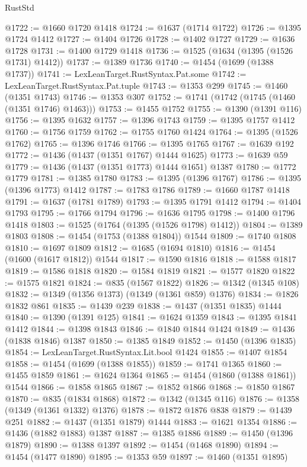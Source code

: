 \begin{lexlean}{RustStd}
\begin{coremodule}
{\begin{coremodule}
{{{{{{{{{{@1722 := @1660 @1720 @1418
@1724 := @1637 (@1714 @1722)
@1726 := @1395 @1724 @1412
@1727 := @1404 @1726
@1728 := @1402 @1727
@1729 := @1636 @1728
@1731 := @1400 @1729 @1418
@1736 := @1525 (@1634 (@1395 (@1526 @1731) @1412))
@1737 := @1389 @1736
@1740 := @1454 (@1699 (@1388 @1737))
@1741 := LexLeanTarget.RustSyntax.Pat.some
@1742 := LexLeanTarget.RustSyntax.Pat.tuple
@1743 := @1353 @299
@1745 := @1460 (@1351 @1743)
@1746 := @1353 @307
@1752 := @1741 (@1742 (@1745 (@1460 (@1351 @1746) @1463)))
@1753 := @1455 @1752
@1755 := @1390 (@1391 @116)
@1756 := @1395 @1632
@1757 := @1396 @1743
@1759 := @1395 @1757 @1412
@1760 := @1756 @1759
@1762 := @1755 @1760 @1424
@1764 := @1395 (@1526 @1762)
@1765 := @1396 @1746
@1766 := @1395 @1765
@1767 := @1639 @192
@1772 := @1436 (@1437 (@1351 @1767) @1444 @1625)
@1773 := @1639 @59
@1779 := @1436 (@1437 (@1351 @1773) @1444 @1651) @1387
@1780 := @1772 @1779
@1781 := @1385 @1780
@1783 := @1395 (@1396 @1767)
@1786 := @1395 (@1396 @1773) @1412
@1787 := @1783 @1786
@1789 := @1660 @1787 @1418
@1791 := @1637 (@1781 @1789)
@1793 := @1395 @1791 @1412
@1794 := @1404 @1793
@1795 := @1766 @1794
@1796 := @1636 @1795
@1798 := @1400 @1796 @1418
@1803 := @1525 (@1764 (@1395 (@1526 @1798) @1412))
@1804 := @1389 @1803
@1808 := @1454 (@1753 (@1388 @1804)) @1544
@1809 := @1740 @1808
@1810 := @1697 @1809
@1812 := @1685 (@1694 @1810)
@1816 := @1454 (@1600 (@1617 @1812)) @1544
@1817 := @1590 @1816
@1818 := @1588 @1817
@1819 := @1586 @1818
@1820 := @1584 @1819
@1821 := @1577 @1820
@1822 := @1575 @1821
@1824 := @835 (@1567 @1822)
@1826 := @1342 (@1345 @108)
@1832 := @1349 (@1356 @1373) (@1349 (@1361 @859) @1376)
@1834 := @1826 @1832 @861
@1835 := @1439 @239
@1838 := @1437 (@1351 @1835) @1444
@1840 := @1390 (@1391 @125)
@1841 := @1624 @1359
@1843 := @1395 @1841 @1412
@1844 := @1398 @1843
@1846 := @1840 @1844 @1424
@1849 := @1436 (@1838 @1846) @1387
@1850 := @1385 @1849
@1852 := @1450 (@1396 @1835)
@1854 := LexLeanTarget.RustSyntax.Lit.bool @1424
@1855 := @1407 @1854
@1858 := @1454 (@1699 (@1388 @1855))
@1859 := @1741 @1365
@1860 := @1455 @1859
@1861 := @1624 @1364
@1865 := @1454 (@1860 (@1388 @1861)) @1544
@1866 := @1858 @1865
@1867 := @1852 @1866
@1868 := @1850 @1867
@1870 := @835 (@1834 @1868)
@1872 := @1342 (@1345 @116)
@1876 := @1358 (@1349 (@1361 @1332) @1376)
@1878 := @1872 @1876 @838
@1879 := @1439 @251
@1882 := @1437 (@1351 @1879) @1444
@1883 := @1621 @1354
@1886 := @1436 (@1882 @1883) @1387
@1887 := @1385 @1886
@1889 := @1450 (@1396 @1879)
@1890 := @1388 @1397
@1892 := @1454 (@1468 @1890)
@1894 := @1454 (@1477 @1890)
@1895 := @1353 @59
@1897 := @1460 (@1351 @1895)
}}}}}}}}}}
\end{coremodule}}
\end{coremodule}
\end{lexlean}
